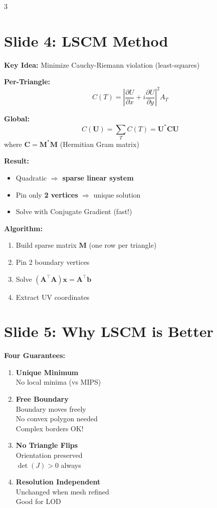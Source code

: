 \documentclass[10pt,landscape]{article}
\newcommand{\slide}[1]{\section*{Slide #1}}
\begin{document}
\begin{multicols}{3}
\slide{4: LSCM Method}
\textbf{Key Idea:} Minimize Cauchy-Riemann violation (least-squares)

\textbf{Per-Triangle:}
\[
C(T) = \left| \frac{\partial U}{\partial x} + i \frac{\partial U}{\partial y} \right|^2 A_T
\]

\textbf{Global:}
\[
C(\mathbf{U}) = \sum_{T} C(T) = \mathbf{U}^* \mathbf{C} \mathbf{U}
\]
where $\mathbf{C} = \mathbf{M}^* \mathbf{M}$ (Hermitian Gram matrix)

\textbf{Result:}
\begin{itemize}
\item Quadratic $\Rightarrow$ \textbf{sparse linear system}
\item Pin only \textbf{2 vertices} $\Rightarrow$ unique solution
\item Solve with Conjugate Gradient (fast!)
\end{itemize}

\textbf{Algorithm:}
\begin{enumerate}
\item Build sparse matrix $\mathbf{M}$ (one row per triangle)
\item Pin 2 boundary vertices
\item Solve $(\mathbf{A}^\top \mathbf{A})\mathbf{x} = \mathbf{A}^\top \mathbf{b}$
\item Extract UV coordinates
\end{enumerate}

\slide{5: Why LSCM is Better}
\textbf{Four Guarantees:}

\begin{enumerate}
\item \textbf{Unique Minimum}\\
No local minima (vs MIPS)

\item \textbf{Free Boundary}\\
Boundary moves freely\\
No convex polygon needed\\
Complex borders OK!

\item \textbf{No Triangle Flips}\\
Orientation preserved\\
$\det(J) > 0$ always

\item \textbf{Resolution Independent}\\
Unchanged when mesh refined\\
Good for LOD
\end{enumerate}


\end{multicols}
\end{document}
